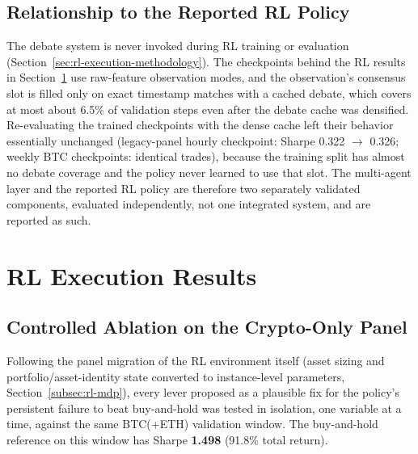 \subsection{Relationship to the Reported RL Policy}
\label{subsec:agent-rl-disconnect}

The debate system is never invoked during RL training or evaluation (Section~\ref{sec:rl-execution-methodology}). The checkpoints behind the RL results in Section~\ref{sec:rl-results} use raw-feature observation modes, and the observation's consensus slot is filled only on exact timestamp matches with a cached debate, which covers at most about 6.5\% of validation steps even after the debate cache was densified. Re-evaluating the trained checkpoints with the dense cache left their behavior essentially unchanged (legacy-panel hourly checkpoint: Sharpe 0.322 $\to$ 0.326; weekly BTC checkpoints: identical trades), because the training split has almost no debate coverage and the policy never learned to use that slot. The multi-agent layer and the reported RL policy are therefore two separately validated components, evaluated independently, not one integrated system, and are reported as such.

\section{RL Execution Results}
\label{sec:rl-results}

\subsection{Controlled Ablation on the Crypto-Only Panel}
\label{subsec:rl-ablation-results}

Following the panel migration of the RL environment itself (asset sizing and portfolio/asset-identity state converted to instance-level parameters, Section~\ref{subsec:rl-mdp}), every lever proposed as a plausible fix for the policy's persistent failure to beat buy-and-hold was tested in isolation, one variable at a time, against the same BTC(+ETH) validation window. The buy-and-hold reference on this window has Sharpe \textbf{1.498} (91.8\% total return).

